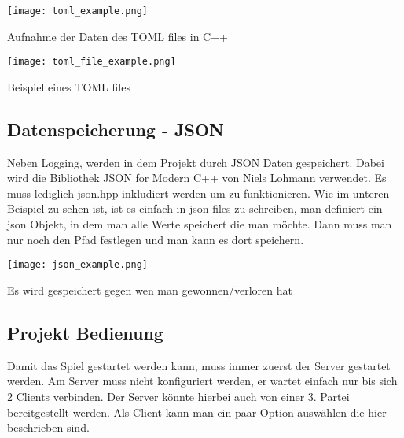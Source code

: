 \documentclass{article}
\begin{document}
\centering
\texttt{[image: toml\_example.png]}
\caption{Aufnahme der Daten des TOML files in C++}

\begin{center}
\texttt{[image: toml\_file\_example.png]}
\center \caption{Beispiel eines TOML files}
\end{center}
 \begin{flushleft}

 \subsection{Datenspeicherung - JSON}
Neben Logging, werden in dem Projekt durch JSON Daten gespeichert. Dabei wird die Bibliothek JSON for Modern C++ von Niels Lohmann verwendet. Es muss lediglich json.hpp inkludiert werden um zu funktionieren. Wie im unteren Beispiel zu sehen ist, ist es einfach in json files zu schreiben, man definiert ein json Objekt, in dem man alle Werte speichert die man möchte. Dann muss man nur noch den Pfad festlegen und man kann es dort speichern.
 \end{flushleft}
 
\centering
\texttt{[image: json\_example.png]}
\caption{Es wird gespeichert gegen wen man gewonnen/verloren hat}

 \begin{flushleft}

\subsection{Projekt Bedienung}
Damit das Spiel gestartet werden kann, muss immer zuerst der Server gestartet werden. Am Server muss nicht konfiguriert werden, er wartet einfach nur bis sich 2 Clients verbinden. Der Server könnte hierbei auch von einer 3. Partei bereitgestellt werden. Als Client kann man ein paar Option auswählen die hier beschrieben sind.


\end{flushleft}
\end{document}
